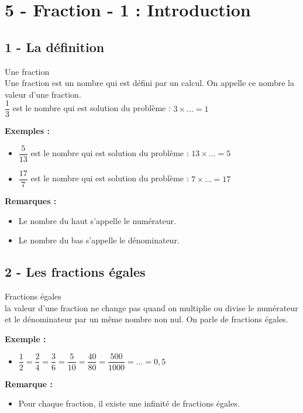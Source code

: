 



\section*{5 - Fraction - 1 : Introduction}

\subsection*{1 - La définition}

\begin{Definition}{Une fraction}\\
  Une fraction est un nombre qui est défini par un calcul. On appelle ce nombre la valeur d'une fraction. \\
  $\dfrac{1}{3}$ est le nombre qui est solution du problème : $3 \times ... = 1$
\end{Definition}

\textbf{Exemples : }

\begin{itemize}[label={$\bullet$}]
  \item $\dfrac{5}{13}$ est le nombre qui est solution du problème : $13 \times ... = 5$
  \item $\dfrac{17}{7}$ est le nombre qui est solution du problème : $7 \times ... = 17$
\end{itemize}

\textbf{Remarques : }

\begin{itemize}[label={$\bullet$}]
  \item Le nombre du haut s'appelle le numérateur.
  \item Le nombre du bas s'appelle le dénominateur.
\end{itemize}

\subsection*{2 - Les fractions égales}


\begin{Definition}{Fractions égales}\\
  la valeur d'une fraction ne change pas quand on multiplie ou divise le numérateur et le dénominateur par un même nombre non nul. On parle de fractions égales.
\end{Definition}

\textbf{Exemple : }

\begin{itemize}[label={$\bullet$}]
  \item $\dfrac{1}{2} = \dfrac{2}{4} = \dfrac{3}{6} = \dfrac{5}{10} = \dfrac{40}{80} = \dfrac{500}{1000} = ... = 0,5$ 
\end{itemize}

\textbf{Remarque : }

\begin{itemize}[label={$\bullet$}]
  \item Pour chaque fraction, il existe une infinité de fractions égales.
\end{itemize}


